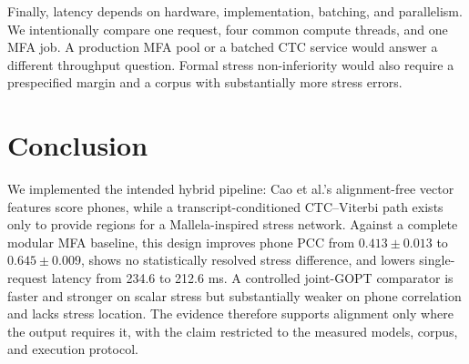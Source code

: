 \documentclass[10pt,conference]{IEEEtran}
\begin{document}
Finally, latency depends on hardware, implementation, batching, and
parallelism. We intentionally compare one request, four common compute threads,
and one MFA job. A production MFA pool or a batched CTC service would answer a
different throughput question. Formal stress non-inferiority would also
require a prespecified margin and a corpus with substantially more stress
errors.

\section{Conclusion}

We implemented the intended hybrid pipeline: Cao et al.'s alignment-free vector
features score phones, while a transcript-conditioned CTC--Viterbi path exists
only to provide regions for a Mallela-inspired stress network. Against a
complete modular MFA baseline, this design improves phone PCC from
$0.413\pm0.013$ to $0.645\pm0.009$, shows no statistically resolved stress
difference, and lowers single-request latency from 234.6 to 212.6 ms. A
controlled joint-GOPT comparator is faster and stronger on scalar stress but
substantially weaker on phone correlation and lacks stress location. The
evidence therefore supports alignment only where the output requires it, with
the claim restricted to the measured models, corpus, and execution protocol.

\balance


\end{document}
